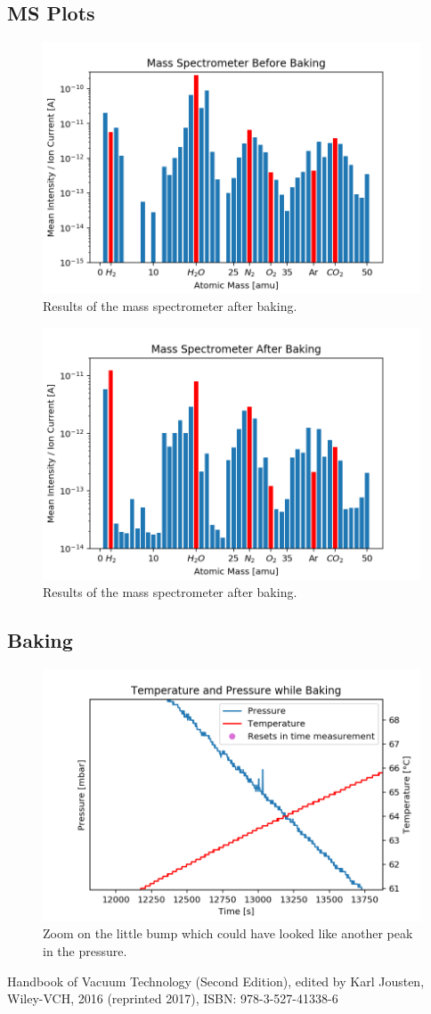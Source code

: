 \documentclass[]{article}
\begin{document}
\subsection{MS Plots}
\label{MS Plots}

\begin{figure}[!h]
\centering\includegraphics[width=.5\textwidth]{Plots/MSbefore.png}
\caption{Results of the mass spectrometer after baking.}
\label{fig::MSbefore}
\end{figure}

\begin{figure}[!h]
\centering\includegraphics[width=.5\textwidth]{Plots/MSafter.png}
\caption{Results of the mass spectrometer after baking.}
\label{fig::MSafter}
\end{figure}

\subsection{Baking}
\begin{figure}[!h]
\centering\includegraphics[width=.5\textwidth]{Plots/FluktuationBaking.png}
\caption{Zoom on the little bump which could have looked like another peak in the pressure.}
\label{fig::bump}
\end{figure}

\newpage
\begin{thebibliography}{9}

 Handbook of Vacuum Technology (Second Edition), edited by Karl Jousten, Wiley-VCH, 2016 (reprinted 2017), ISBN: 978-3-527-41338-6

\end{thebibliography}
\end{document}
